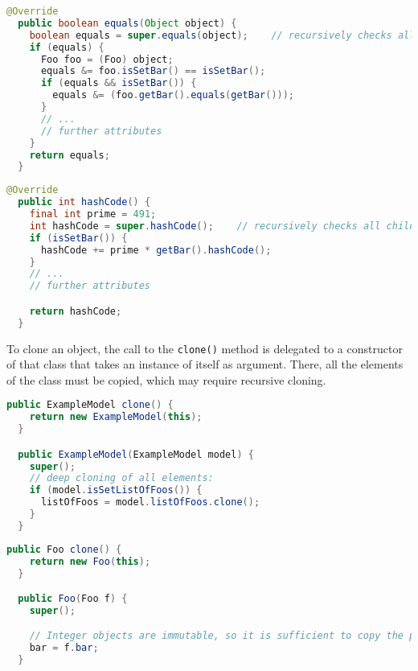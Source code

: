 \begin{lstlisting}[language=Java,caption={Example of the \texttt{equals} method},label={lst:ModelExtEquals}]
  @Override
  public boolean equals(Object object) {
    boolean equals = super.equals(object);    // recursively checks all children
    if (equals) {
      Foo foo = (Foo) object;
      equals &= foo.isSetBar() == isSetBar();
      if (equals && isSetBar()) {
        equals &= (foo.getBar().equals(getBar()));
      }
      // ...
      // further attributes
    }
    return equals;
  }
\end{lstlisting}


\begin{lstlisting}[language=Java,caption={Example of the \texttt{hashCode}
method. The variable \texttt{prime} should be a large prime number to prevent
collisions},label={lst:ModelExtHashCode}] 
  @Override 
  public int hashCode() {
    final int prime = 491;
    int hashCode = super.hashCode();    // recursively checks all children
    if (isSetBar()) {
      hashCode += prime * getBar().hashCode();
    }
    // ...
    // further attributes

    return hashCode;
  }
\end{lstlisting}

To clone an object, the call to the \texttt{clone()} method is delegated to a
constructor of that class that takes an instance of itself as argument.
There, all the elements of the class must be copied, which may require recursive cloning.

\begin{lstlisting}[language=Java,caption={Example of the \texttt{clone} method
for the \texttt{ExampleModel} class},label={lst:ModelExtClone}] 
  public ExampleModel clone() {
    return new ExampleModel(this);
  }

  public ExampleModel(ExampleModel model) {
    super();
    // deep cloning of all elements:
    if (model.isSetListOfFoos()) {
      listOfFoos = model.listOfFoos.clone();
    }
  }
\end{lstlisting}

\begin{lstlisting}[language=Java,caption={Example of the \texttt{clone} method
for the \texttt{Foo} class},label={lst:ModelExtCloneFoo}] 
  public Foo clone() {
    return new Foo(this);
  }

  public Foo(Foo f) {
    super();

    // Integer objects are immutable, so it is sufficient to copy the pointer
    bar = f.bar;
  }
\end{lstlisting}


